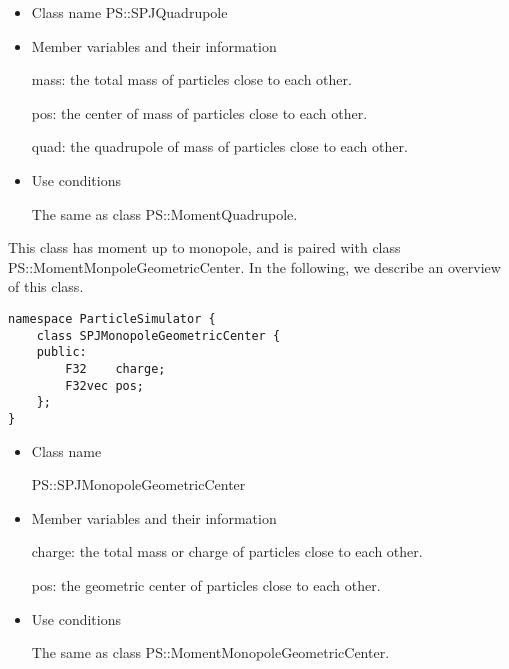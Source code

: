\begin{itemize}
\item Class name
  PS::SPJQuadrupole

\item Member variables and their information

  mass: the total mass of particles close to each other.

  pos: the center of mass of particles close to each other.

  quad: the quadrupole of mass of particles close to each other.

\item Use conditions

  The same as class PS::MomentQuadrupole.

\end{itemize}


This class has moment up to monopole, and is paired with class \\
PS::MomentMonpoleGeometricCenter. In the following, we describe an
overview of this class.
\begin{screen}
\begin{verbatim}
namespace ParticleSimulator {
    class SPJMonopoleGeometricCenter {
    public:
        F32    charge;    
        F32vec pos;
    };
}
\end{verbatim}
\end{screen}

\begin{itemize}
\item Class name

  PS::SPJMonopoleGeometricCenter

\item Member variables and their information

  charge: the total mass or charge of particles close to each other.

  pos: the geometric center of particles close to each other.

\item Use conditions

  The same as class PS::MomentMonopoleGeometricCenter.

\end{itemize}

